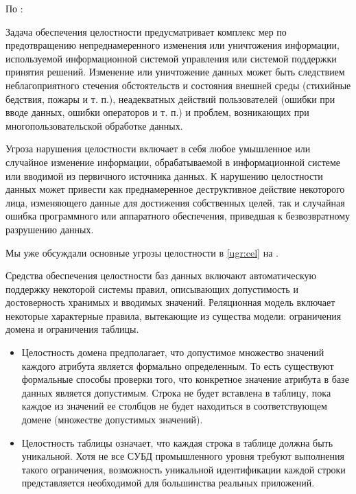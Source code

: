 По \autocite{Smirnov2007}:
\begin{grayquote}
	Задача обеспечения целостности предусматривает комплекс мер по предотвращению непреднамеренного изменения или унич­тожения информации, используемой информационной системой управления или системой поддержки принятия решений. Изменение или уничтожение данных может быть следствием неблагоприятного стечения обстоятельств и состояния внешней среды (стихийные бедствия, пожары и т. п.), неадекватных действий пользователей (ошибки при вводе данных, ошибки операторов и т. п.) и проблем, возникающих при многопользовательской обработке данных.
	
	Угроза нарушения целостности включает в себя любое умыш­ленное или случайное изменение информации, обрабатываемой в информационной системе или вводимой из первичного источника
	данных. К нарушению целостности данных может привести как преднамеренное деструктивное действие некоторого лица, изменяющего данные для достижения собственных целей, так и
	случайная ошибка программного или аппаратного обеспечения, приведшая к безвозвратному разрушению данных.
\end{grayquote}

Мы уже обсуждали основные угрозы целостности в \ref{ugr:cel} на \pageref{ugr:cel}.

Средства обеспечения целостности баз данных включают автоматическую поддержку некоторой системы правил, описывающих допустимость и достоверность хранимых и вводимых значений. Реляционная модель включает некоторые характерные правила, вытекающие из существа модели: ограничения домена и ограничения таблицы.
\begin{itemize}
	\item Целостность домена предполагает, что допустимое множество значений каждого атрибута является формально определенным. То есть существуют формальные способы проверки того, что конкретное значение атрибута в базе данных является допустимым. Строка не будет вставлена в таблицу, пока каждое из значений ее столбцов не будет находиться в соответствующем домене (множестве допустимых значений).
	\item Целостность таблицы означает, что каждая строка в таблице	должна быть уникальной. Хотя не все СУБД промышленного уровня требуют выполнения такого ограничения, возможность уникальной идентификации каждой строки представляется необходимой для большинства реальных приложений.
\end{itemize}

